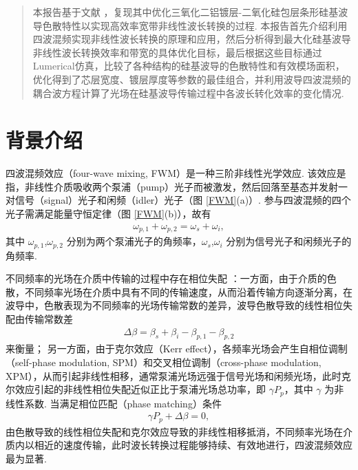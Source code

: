 \documentclass[zh]{assignment}
\begin{document}
\tableofcontents

\begin{abstract}
    本报告基于文献 \cite{guo2018experimentally}，复现其中优化三氧化二铝镀层-二氧化硅包层条形硅基波导色散特性以实现高效率宽带非线性波长转换的过程. 本报告首先介绍利用四波混频实现非线性波长转换的原理和应用，然后分析得到最大化硅基波导非线性波长转换效率和带宽的具体优化目标，最后根据这些目标通过Lumerical仿真，比较了各种结构的硅基波导的色散特性和有效模场面积，优化得到了芯层宽度、镀层厚度等参数的最佳组合，并利用波导四波混频的耦合波方程计算了光场在硅基波导传输过程中各波长转化效率的变化情况.
\end{abstract}

\section{背景介绍}

四波混频效应（four-wave mixing, FWM）是一种三阶非线性光学效应. 该效应是指，非线性介质吸收两个泵浦（pump）光子而被激发，然后回落至基态并发射一对信号（signal）光子和闲频（idler）光子（图 \ref{FWM}(a)）. 参与四波混频的四个光子需满足能量守恒定律（图 \ref{FWM}(b)），故有
\begin{align}
    \omega_{p,1}+\omega_{p,2}=\omega_s+\omega_i,
\end{align}
其中 $\omega_{p,1}$,$\omega_{p,2}$ 分别为两个泵浦光子的角频率，$\omega_s$,$\omega_i$ 分别为信号光子和闲频光子的角频率.

不同频率的光场在介质中传输的过程中存在相位失配 \cite{RN158}：一方面，由于介质的色散，不同频率光场在介质中具有不同的传输速度，从而沿着传输方向逐渐分离，在波导中，色散表现为不同频率的光场传输常数的差异，波导色散导致的线性相位失配由传输常数差
\begin{align}
    \Delta\beta=\beta_s+\beta_i-\beta_{p,1}-\beta_{p,2}
\end{align}
来衡量；
另一方面，由于克尔效应（Kerr effect），各频率光场会产生自相位调制（self-phase modulation, SPM）和交叉相位调制（cross-phase modulation, XPM），从而引起非线性相移，通常泵浦光场远强于信号光场和闲频光场，此时克尔效应引起的非线性相位失配近似正比于泵浦光场总功率，即 $\gamma P_p$，其中 $\gamma$ 为非线性系数. 当满足相位匹配（phase matching）条件
\begin{align}
    \label{phase-matching condition}
    \gamma P_p+\Delta\beta=0,
\end{align}
由色散导致的线性相位失配和克尔效应导致的非线性相移抵消，不同频率光场在介质内以相近的速度传输，此时波长转换过程能够持续、有效地进行，四波混频效应最为显著.
\end{document}
